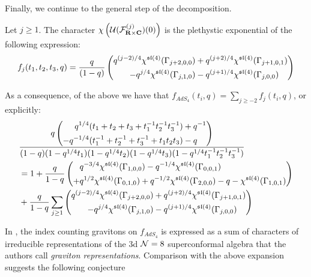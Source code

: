 \documentclass[../main.tex]{subfiles}
\begin{document}
\parsec[]
Finally, we continue to the general step of the decomposition.

\begin{prop}
Let $j\geq 1$. The character $\chi \left ( \mathcal{U} (\mathcal{F}^{(j)}_{\mathbf{R}\times \mathbf{C}} ) (0)\right )$ is the plethystic exponential of the following expression:
\begin{equation}
f_j(t_1, t_2, t_3, q) = \frac{q}{(1-q)}\left (\begin{aligned} q^{(j-2)/4}\chi^{\mathfrak{sl}(4)}(\Gamma_{j+2,0,0})  &+ q^{(j+2)/4}\chi^{\mathfrak{sl}(4)}(\Gamma_{j+1,0,1}) \\ - q^{j/4}\chi^{\mathfrak{sl}(4)}(\Gamma_{j,1,0}) & - q^{(j+1)/4}\chi^{\mathfrak{sl}(4)}(\Gamma_{j,0,0}) \end{aligned}\right)
\end{equation}
\end{prop}

\parsec[]
As a consequence, of the above we have that $f_{AdS_4} (t_i, q) = \sum_{j\geq -2} f_j (t_i, q)$, or explicitly:
\begin{align*}
& \frac{q\left (\begin{aligned} q^{1/4}(t_1+ t_2 + t_3+t_1^{-1}t_2^{-1}t_3^{-1}) &+ q^{-1} \\- q^{-1/4}(t_1^{-1}+ t_2^{-1} + t_3^{-1}+t_1t_2t_3) &- q   \end{aligned}\right)}{(1-q)(1-q^{1/4}t_1)(1-q^{1/4}t_2)(1-q^{1/4}t_3)(1-q^{1/4}t_1^{-1}t_2^{-1}t_3^{-1})}  \\ 
& =  1 + \frac{q}{1-q} \left (\begin{aligned} & q^{-3/4}\chi^{\mathfrak{sl}(4)}(\Gamma_{1,0,0}) - q^{-1/4}\chi^{\mathfrak{sl}(4)}(\Gamma_{0,0,1}) \\+ & q^{1/2}\chi^{\mathfrak{sl}(4)}(\Gamma_{0,1,0})  + q^{-1/2}\chi^{\mathfrak{sl}(4)}(\Gamma_{2,0,0})  - q - \chi^{\mathfrak{sl}(4)}(\Gamma_{1,0,1}) \end{aligned}\right ) \\
& + \frac{q}{1-q} \sum_{j\geq 1} \left (\begin{aligned} q^{(j-2)/4}\chi^{\mathfrak{sl}(4)}(\Gamma_{j+2,0,0})  &+ q^{(j+2)/4}\chi^{\mathfrak{sl}(4)}(\Gamma_{j+1,0,1}) \\ - q^{j/4}\chi^{\mathfrak{sl}(4)}(\Gamma_{j,1,0}) & - q^{(j+1)/4}\chi^{\mathfrak{sl}(4)}(\Gamma_{j,0,0}) \end{aligned}\right ) 
\end{align*}

In \cite[Eq. (2.15, 2.16)]{Bhattacharya:2008zy}, the index counting gravitons on $f_{AdS_4}$ is expressed as a sum of characters of irreducible representations of the 3d $\mathcal{N} = 8$ superconformal algebra that the authors call \textit{graviton representations}. Comparison with the above expansion suggests the following conjecture
\end{document}
